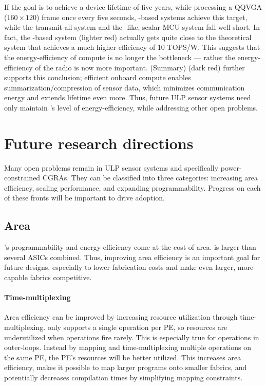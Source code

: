 If the goal is to achieve a device lifetime of five years, while processing a QQVGA ($160\times120$) frame once every five seconds, \riptide-based systems achieve this target, while the transmit-all system and the \sonic-like, scalar-MCU system fall well short.
% 
In fact, the \riptide-based system (lighter red) actually gets quite close to the theoretical system that achieves a much higher efficiency of 10 TOPS/W.
% 
This suggests that the energy-efficiency of compute is no longer the bottleneck --- rather the energy-efficiency of the radio is now more important.
% 
\riptide (Summary) (dark red) further supports this conclusion; efficient onboard compute enables summarization/compression of sensor data, which minimizes communication energy and extends lifetime even more. 
% 
Thus, future ULP sensor systems need only maintain \riptide's level of energy-efficiency, while addressing other open problems.

\section{Future research directions}
Many open problems remain in ULP sensor systems and specifically power-constrained CGRAs.
% 
They can be classified into three categories: increasing area efficiency, scaling performance, and expanding programmability.
% 
Progress on each of these fronts will be important to drive adoption.

\subsection{Area}
\riptide's programmability and energy-efficiency come at the cost of area.
% 
\riptide is larger than several ASICs combined.
% 
Thus, improving area efficiency is an important goal for future designs, especially to lower fabrication costs and make even larger, more-capable fabrics competitive.

\paragraph{Time-multiplexing}
Area efficiency can be improved by increasing resource utilization through time-multiplexing.
% 
\riptide only supports a single operation per PE, so resources are underutilized when operations fire rarely.
% 
This is especially true for operations in outer-loops.
% 
Instead by mapping and time-multiplexing multiple operations on the same PE, the PE's resources will be better utilized.
% 
This increases area efficiency, makes it possible to map larger programs onto smaller fabrics, and potentially decreases compilation times by simplifying mapping constraints.

